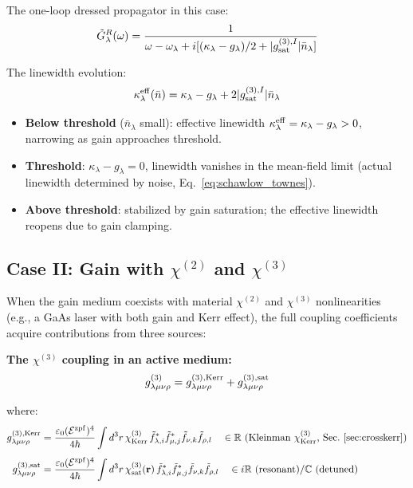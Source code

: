 \documentclass[12pt]{article}
\newcommand{\zpf}{{\rm zpf}}
\begin{document}
The one-loop dressed propagator in this case:
\begin{equation}
  \tilde{G}^R_\lambda(\omega) =
  \frac{1}{\omega - \omega_\lambda + i[(\kappa_\lambda-g_\lambda)/2
  + |g^{(3),I}_{\rm sat}|\bar{n}_\lambda]}
  \label{eq:dressed_gain_only}
\end{equation}

The linewidth evolution:
\begin{equation}
  \kappa_\lambda^{\rm eff}(\bar{n}) =
  \kappa_\lambda - g_\lambda + 2|g^{(3),I}_{\rm sat}|\bar{n}_\lambda
  \label{eq:gain_linewidth}
\end{equation}

\begin{itemize}
  \item \textbf{Below threshold} ($\bar{n}_\lambda$ small):
    effective linewidth $\kappa_\lambda^{\rm eff} = \kappa_\lambda - g_\lambda > 0$,
    narrowing as gain approaches threshold.
  \item \textbf{Threshold}: $\kappa_\lambda - g_\lambda = 0$, linewidth vanishes
    in the mean-field limit (actual linewidth determined by noise, Eq.~\ref{eq:schawlow_townes}).
  \item \textbf{Above threshold}: stabilized by gain saturation;
    the effective linewidth reopens due to gain clamping.
\end{itemize}

\subsection{Case II: Gain with $\chi^{(2)}$ and $\chi^{(3)}$}
\label{sec:gain_and_NL}

When the gain medium coexists with material $\chi^{(2)}$ and $\chi^{(3)}$
nonlinearities (e.g., a GaAs laser with both gain and Kerr effect), the
full coupling coefficients acquire contributions from three sources:

\textbf{The $\chi^{(3)}$ coupling in an active medium:}
\begin{equation}
  g^{(3)}_{\lambda\mu\nu\rho} =
  g^{(3),\rm Kerr}_{\lambda\mu\nu\rho}
  + g^{(3),\rm sat}_{\lambda\mu\nu\rho}
  \label{eq:g3_total}
\end{equation}

where:
\begin{align}
  g^{(3),\rm Kerr}_{\lambda\mu\nu\rho} &=
  \frac{\varepsilon_0(\mathcal{E}^\zpf)^4}{4\hbar}
  \int d^3r\,\chi^{(3)}_{\rm Kerr}\,
  \tilde{f}_{\lambda,i}^*\tilde{f}_{\mu,j}^*
  \tilde{f}_{\nu,k}\tilde{f}_{\rho,l}
  \quad\in\mathbb{R}\text{ (Kleinman $\chi^{(3)}_{\rm Kerr}$, Sec.~\ref{sec:crosskerr})}
  \label{eq:g3_Kerr}\\[4pt]
  g^{(3),\rm sat}_{\lambda\mu\nu\rho} &=
  \frac{\varepsilon_0(\mathcal{E}^\zpf)^4}{4\hbar}
  \int d^3r\,\chi^{(3)}_{\rm sat}(\mathbf{r})\,
  \tilde{f}_{\lambda,i}^*\tilde{f}_{\mu,j}^*
  \tilde{f}_{\nu,k}\tilde{f}_{\rho,l}
  \quad\in i\mathbb{R}\text{ (resonant)}/\mathbb{C}\text{ (detuned)}
  \label{eq:g3_sat_coupling}
\end{align}
\end{document}
